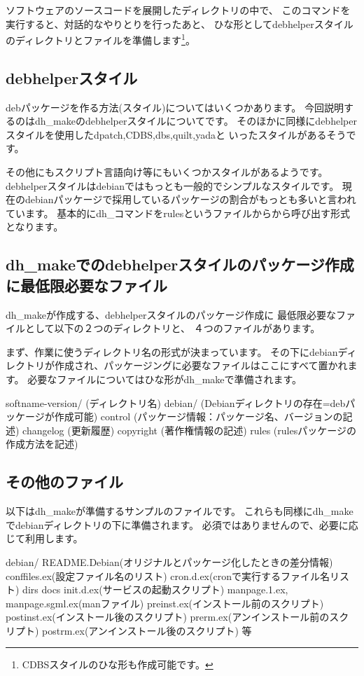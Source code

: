 \documentclass[mingoth,a4paper]{jsarticle}
\begin{document}
ソフトウェアのソースコードを展開したディレクトリの中で、
このコマンドを実行すると、対話的なやりとりを行ったあと、
ひな形としてdebhelperスタイルのディレクトリとファイルを準備します\footnote{CDBSスタイルのひな形も作成可能です。}。

\subsection{debhelperスタイル}
debパッケージを作る方法(スタイル)についてはいくつかあります。
今回説明するのはdh\_makeのdebhelperスタイルについてです。
そのほかに同様にdebhelperスタイルを使用したdpatch,CDBS,dbs,quilt,yadaと
いったスタイルがあるそうです。

その他にもスクリプト言語向け等にもいくつかスタイルがあるようです。
debhelperスタイルはdebianではもっとも一般的でシンプルなスタイルです。
現在のdebianパッケージで採用しているパッケージの割合がもっとも多いと言われています。
基本的にdh\_コマンドをrulesというファイルからから呼び出す形式となります。

\subsection{dh\_makeでのdebhelperスタイルのパッケージ作成に最低限必要なファイル}

dh\_makeが作成する、debhelperスタイルのパッケージ作成に
最低限必要なファイルとして以下の２つのディレクトリと、
４つのファイルがあります。

まず、作業に使うディレクトリ名の形式が決まっています。
その下にdebianディレクトリが作成され、パッケージングに必要なファイルはここにすべて置かれます。
必要なファイルについてはひな形がdh\_makeで準備されます。
\begin{commandline}
softname-version/ (ディレクトリ名)
  debian/ (Debianディレクトリの存在=debパッケージが作成可能)
     control (パッケージ情報：パッケージ名、バージョンの記述)
     changelog (更新履歴)
     copyright (著作権情報の記述)
     rules (rulesパッケージの作成方法を記述)
\end{commandline}

\subsection{その他のファイル}

以下はdh\_makeが準備するサンプルのファイルです。
これらも同様にdh\_makeでdebianディレクトリの下に準備されます。
必須ではありませんので、必要に応じて利用します。

\begin{commandline}
debian/
  README.Debian(オリジナルとパッケージ化したときの差分情報)
  conffiles.ex(設定ファイル名のリスト)
  cron.d.ex(cronで実行するファイル名リスト)
  dirs
  docs
  init.d.ex(サービスの起動スクリプト)
  manpage.1.ex, manpage.sgml.ex(manファイル)
  preinst.ex(インストール前のスクリプト)
  postinst.ex(インストール後のスクリプト)
  prerm.ex(アンインストール前のスクリプト)
  postrm.ex(アンインストール後のスクリプト)
  等
\end{commandline}
\end{document}
